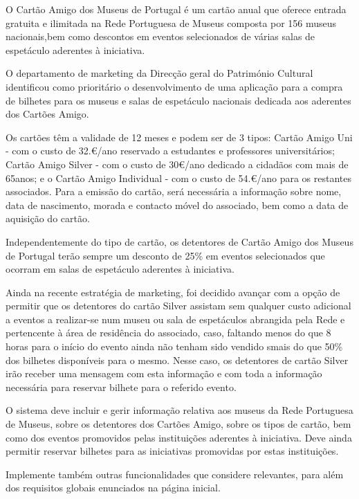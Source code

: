 O Cartão Amigo dos Museus de Portugal é um cartão anual que oferece entrada gratuita e ilimitada na Rede Portuguesa de Museus composta por 156 museus nacionais,bem como descontos em eventos selecionados de várias salas de espetáculo aderentes à iniciativa.

O departamento de marketing da Direcção geral do Património Cultural identificou como prioritário o desenvolvimento de uma aplicação para a compra de bilhetes para os museus e salas de espetáculo nacionais dedicada aos aderentes dos Cartões Amigo.

Os cartões têm a validade de 12 meses e podem ser de 3 tipos\+: Cartão Amigo Uni -\/ com o custo de 32.€/ano reservado a estudantes e professores universitários; Cartão Amigo Silver -\/ com o custo de 30€/ano dedicado a cidadãos com mais de 65anos; e o Cartão Amigo Individual -\/ com o custo de 54.€/ano para os restantes associados. Para a emissão do cartão, será necessária a informação sobre nome, data de nascimento, morada e contacto móvel do associado, bem como a data de aquisição do cartão.

Independentemente do tipo de cartão, os detentores de Cartão Amigo dos Museus de Portugal terão sempre um desconto de 25\% em eventos selecionados que ocorram em salas de espetáculo aderentes à iniciativa.

Ainda na recente estratégia de marketing, foi decidido avançar com a opção de permitir que os detentores do cartão Silver assistam sem qualquer custo adicional a eventos a realizar-\/se num museu ou sala de espetáculos abrangida pela Rede e pertencente à área de residência do associado, caso, faltando menos do que 8 horas para o início do evento ainda não tenham sido vendido smais do que 50\% dos bilhetes disponíveis para o mesmo. Nesse caso, os detentores de cartão Silver irão receber uma mensagem com esta informação e com toda a informação necessária para reservar bilhete para o referido evento.

O sistema deve incluir e gerir informação relativa aos museus da Rede Portuguesa de Museus, sobre os detentores dos Cartões Amigo, sobre os tipos de cartão, bem como dos eventos promovidos pelas instituições aderentes à iniciativa. Deve ainda permitir reservar bilhetes para as iniciativas promovidas por estas instituições.

Implemente também outras funcionalidades que considere relevantes, para além dos requisitos globais enunciados na página inicial. 